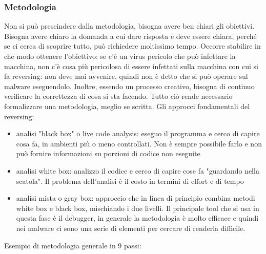 \documentclass[12pt, oneside]{extbook}
\begin{document}
\subsubsection{Metodologia}
Non si può prescindere dalla metodologia, bisogna avere ben chiari gli obiettivi. Bisogna avere chiaro la domanda a cui dare risposta e deve essere chiara, perché se ci cerca di scoprire tutto, può richiedere moltissimo tempo. Occorre stabilire in che modo ottenere l'obiettivo: se c'è un virus pericolo che può infettare la macchina, non c'è cosa più pericolosa di essere infettati sulla macchina con cui si fa reversing: non deve mai avvenire, quindi non è detto che si può operare sul malware eseguendolo. Inoltre, essendo un processo creativo, bisogna di continuo verificare la correttezza di cosa si sta facendo. Tutto ciò rende necessario formalizzare una metodologia, meglio se scritta. Gli approcci fondamentali del reversing:
\begin{itemize}
\item analisi "black box" o live code analysis: eseguo il programma e cerco di capire cosa fa, in ambienti più o meno controllati. Non è sempre possibile farlo e non può fornire informazioni su porzioni di codice non eseguite
\item analisi white box: analizzo il codice e cerco di capire cose fa "guardando nella scatola". Il problema dell'analisi è il costo in termini di effort e di tempo
\item analisi mista o gray box: approccio che in linea di principio combina metodi white box e black box, mischiando i due livelli. Il principale tool che si usa in questa fase è il debugger, in generale la metodologia è molto efficace e quindi nei malware ci sono una serie di elementi per cercare di renderla difficile.
\end{itemize}
Esempio di metodologia generale in 9 passi:
\end{document}
